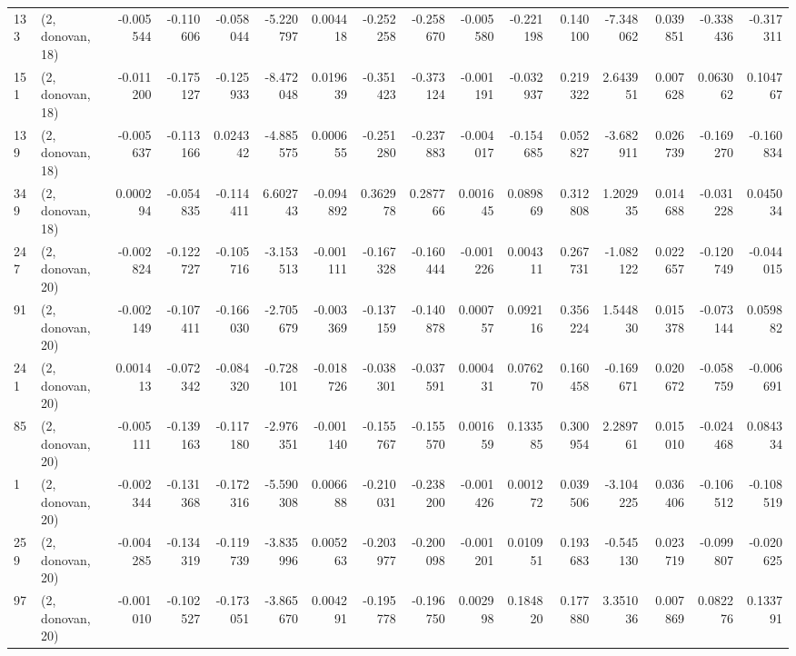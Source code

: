 \begin{tabular}{llrrrrrrrrrrrrrr}
133 &  (2, donovan, 18) &  -0.005544 & -0.110606 & -0.058044 &   -5.220797 &  0.004418 &  -0.252258 & -0.258670 & -0.005580 & -0.221198 &  0.140100 &   -7.348062 &  0.039851 & -0.338436 & -0.317311 \\
151 &  (2, donovan, 18) &  -0.011200 & -0.175127 & -0.125933 &   -8.472048 &  0.019639 &  -0.351423 & -0.373124 & -0.001191 & -0.032937 &  0.219322 &    2.643951 &  0.007628 &  0.063062 &  0.104767 \\
139 &  (2, donovan, 18) &  -0.005637 & -0.113166 &  0.024342 &   -4.885575 &  0.000655 &  -0.251280 & -0.237883 & -0.004017 & -0.154685 &  0.052827 &   -3.682911 &  0.026739 & -0.169270 & -0.160834 \\
349 &  (2, donovan, 18) &   0.000294 & -0.054835 & -0.114411 &    6.602743 & -0.094892 &   0.362978 &  0.287766 &  0.001645 &  0.089869 &  0.312808 &    1.202935 &  0.014688 & -0.031228 &  0.045034 \\
247 &  (2, donovan, 20) &  -0.002824 & -0.122727 & -0.105716 &   -3.153513 & -0.001111 &  -0.167328 & -0.160444 & -0.001226 &  0.004311 &  0.267731 &   -1.082122 &  0.022657 & -0.120749 & -0.044015 \\
91  &  (2, donovan, 20) &  -0.002149 & -0.107411 & -0.166030 &   -2.705679 & -0.003369 &  -0.137159 & -0.140878 &  0.000757 &  0.092116 &  0.356224 &    1.544830 &  0.015378 & -0.073144 &  0.059882 \\
241 &  (2, donovan, 20) &   0.001413 & -0.072342 & -0.084320 &   -0.728101 & -0.018726 &  -0.038301 & -0.037591 &  0.000431 &  0.076270 &  0.160458 &   -0.169671 &  0.020672 & -0.058759 & -0.006691 \\
85  &  (2, donovan, 20) &  -0.005111 & -0.139163 & -0.117180 &   -2.976351 & -0.001140 &  -0.155767 & -0.155570 &  0.001659 &  0.133585 &  0.300954 &    2.289761 &  0.015010 & -0.024468 &  0.084334 \\
1   &  (2, donovan, 20) &  -0.002344 & -0.131368 & -0.172316 &   -5.590308 &  0.006688 &  -0.210031 & -0.238200 & -0.001426 &  0.001272 &  0.039506 &   -3.104225 &  0.036406 & -0.106512 & -0.108519 \\
259 &  (2, donovan, 20) &  -0.004285 & -0.134319 & -0.119739 &   -3.835996 &  0.005263 &  -0.203977 & -0.200098 & -0.001201 &  0.010951 &  0.193683 &   -0.545130 &  0.023719 & -0.099807 & -0.020625 \\
97  &  (2, donovan, 20) &  -0.001010 & -0.102527 & -0.173051 &   -3.865670 &  0.004291 &  -0.195778 & -0.196750 &  0.002998 &  0.184820 &  0.177880 &    3.351036 &  0.007869 &  0.082276 &  0.133791 \\

\end{tabular}
